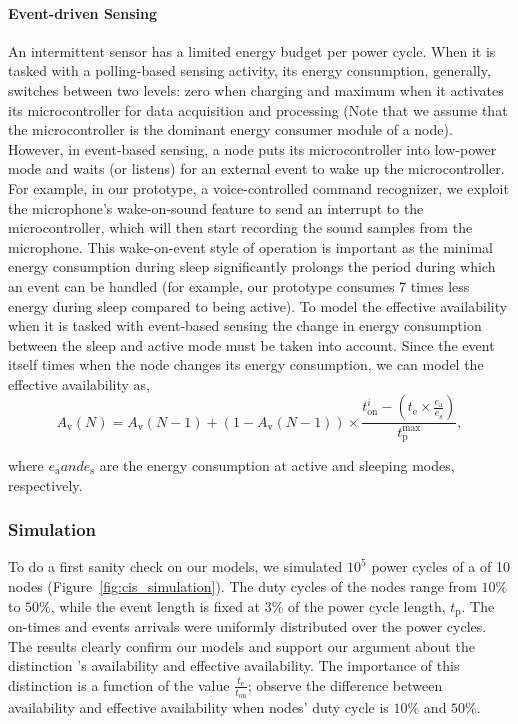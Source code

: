 \paragraph{Event-driven Sensing}
An intermittent sensor has a limited energy budget per power cycle. When it is tasked with a polling-based sensing activity, its energy consumption, generally, switches between two levels: zero when charging and maximum when it activates its microcontroller for data acquisition and processing (Note that we assume that the microcontroller is the dominant energy consumer module of a node). However, in event-based sensing, a node puts its microcontroller into low-power mode and waits (or listens) for an external event to wake up the microcontroller. For example, in our prototype, a voice-controlled command recognizer, we exploit the microphone's wake-on-sound feature to send an interrupt to the microcontroller, which will then start recording the sound samples from the microphone. 
This wake-on-event style of operation is important as the minimal energy consumption during sleep significantly prolongs the period during which an event can be handled (for example, our prototype consumes 7 times less energy during sleep compared to being active).
To model the effective \sys availability when it is tasked with event-based sensing the change in energy consumption between the sleep and active mode must be taken into account. Since the event itself times when the node changes its energy consumption, we can model the effective availability as,
\begin{equation}
		A_\text{v}(N) = A_\text{v}(N-1) + \left(1-A_\text{v}(N-1)\right) \times \frac{t_\text{on}^i - (t_\text{e} \times\frac{e_\text{a}}{e_\text{s}}) }{t_\text{p}^\text{max}},
		\label{eq:cisEventSenseModel}
\end{equation}

where $e_\text{a} and e_\text{s}$ are the energy consumption at active and sleeping modes, respectively.
%
\subsubsection{Simulation}
To do a first sanity check on our models, we simulated $10^5$ power cycles of a \sys of 10 nodes (Figure~\ref{fig:cis_simulation}). The duty cycles of the nodes range from $10\%$ to $50\%$, while the event length is fixed at $3\%$ of the power cycle length, $t_\text{p}$. The on-times and events arrivals were uniformly distributed over the power cycles. 
The results clearly confirm our models and support our argument about the distinction \sys's availability and effective availability. The importance of this distinction is a function of the value $\frac{t_\text{e}}{t_\text{on}}$; observe the difference between availability and effective availability when nodes' duty cycle is $10\%$ and $50\%$.
%
%
